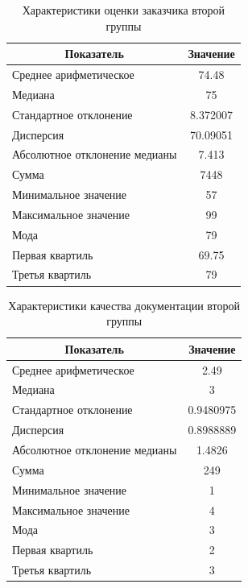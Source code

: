 \begin{table}[H]
	\centering
	\caption{Характеристики оценки заказчика второй группы}
	\begin{tabular}{|l|c|}
		\hline
		\multicolumn{1}{|c|}{\textbf{Показатель}} & \textbf{Значение}\\ \hline
		Среднее арифметическое        & 74.48    \\ \hline
		Медиана                       & 75       \\ \hline
		Стандартное отклонение        & 8.372007 \\ \hline
		Дисперсия                      & 70.09051 \\ \hline
		Абсолютное отклонение медианы & 7.413    \\ \hline
		Сумма                         & 7448     \\ \hline
		Минимальное значение          & 57       \\ \hline
		Максимальное значение         & 99       \\ \hline
		Мода & 79 \\ \hline
		Первая квартиль & 69.75 \\ \hline
		Третья квартиль & 79 \\ \hline
	\end{tabular}
\end{table}


\begin{table}[H]
	\centering
	\caption{Характеристики качества документации второй группы}
	\begin{tabular}{|l|c|}
		\hline
		\multicolumn{1}{|c|}{\textbf{Показатель}} & \textbf{Значение}\\ \hline
		Среднее арифметическое        & 2.49      \\ \hline
		Медиана                       & 3         \\ \hline
		Стандартное отклонение        & 0.9480975 \\ \hline
		Дисперсия                      & 0.8988889 \\ \hline
		Абсолютное отклонение медианы & 1.4826    \\ \hline
		Сумма                         & 249       \\ \hline
		Минимальное значение          & 1         \\ \hline
		Максимальное значение         & 4         \\ \hline
		Мода & 3 \\ \hline
		Первая квартиль & 2 \\ \hline
		Третья квартиль & 3 \\ \hline
	\end{tabular}
\end{table}







